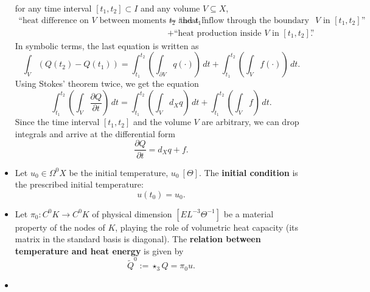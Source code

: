 \begin{discussion}
\begin{itemize}
      for any time interval $[t_1, t_2] \subset I$
      and any volume $V \subseteq X$,
      \begin{equation}
        \begin{split}
        \text{``heat difference on $V$ between moments $t_2$ and $t_1$''}
        & =
          \text{``heat inflow through the boundary of $V$ in $[t_1, t_2]$''} \\
        & +
          \text{``heat production inside $V$ in $[t_1, t_2]$''}.
        \end{split}
      \end{equation}
      In symbolic terms, the last equation is written as
      \begin{equation}
        \int_V (Q(t_2) - Q(t_1)) =
          \int_{t_1}^{t_2} \left(\int_{\partial V} q(\cdot) \right)\, d t
        + \int_{t_1}^{t_2} \left(\int_V f(\cdot) \right)\, d t.
      \end{equation}
      Using Stokes' theorem twice, we get the equation
      \begin{equation}
        \int_{t_1}^{t_2}
          \left(\int_V \frac{\partial Q}{\partial t}\right)\, d t =
          \int_{t_1}^{t_2} \left(\int_V d_X q \right)\, d t
        + \int_{t_1}^{t_2} \left(\int_V f \right)\, d t.
      \end{equation}
      Since the time interval $[t_1, t_2]$ and the volume $V$ are arbitrary,
      we can drop integrals and arrive at the differential form
      \begin{equation}
        \frac{\partial Q}{\partial t} = d_X q + f.
      \end{equation}
    \item
      Let
        $u_0 \in \Omega^0 X$ be the initial temperature, $u_0\ [\Theta]$.
      The \textbf{initial condition} is the prescribed initial temperature:
      \begin{equation}
        u(t_0) = u_0.
      \end{equation}
    \item
      Let $\pi_0 \colon C^0 K \to C^0 K$
      of physical dimension $[E L^{-3} \Theta^{-1}]$
      be a material property of the nodes of $K$,
      playing the role of volumetric heat capacity
      (its matrix in the standard basis is diagonal).
      The \textbf{relation between temperature and heat energy} is given by
      \begin{equation}
        \tilde{Q}^0 := \star_3 Q = \pi_0 u.
      \end{equation}
    \item

\end{itemize}
\end{discussion}

